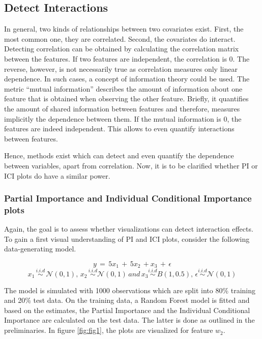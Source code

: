 \documentclass[]{krantz}
\begin{document}
\subsection{Detect Interactions}\label{ch31}

In general, two kinds of relationships between two covariates exist.
First, the most common one, they are correlated. Second, the covariates
do interact. Detecting correlation can be obtained by calculating the
correlation matrix between the features. If two features are
independent, the correlation is 0. The reverse, however, is not
necessarily true as correlation measures only linear dependence. In such
cases, a concept of information theory could be used. The metric
``mutual information'' describes the amount of information about one
feature that is obtained when observing the other feature. Briefly, it
quantifies the amount of shared information between features and
therefore, measures implicitly the dependence between them. If the
mutual information is 0, the features are indeed independent. This
allows to even quantify interactions between features.

Hence, methods exist which can detect and even quantify the dependence
between variables, apart from correlation. Now, it is to be clarified
whether PI or ICI plots do have a similar power.

\subsubsection{Partial Importance and Individual Conditional Importance
plots}\label{ch311}

Again, the goal is to assess whether visualizations can detect
interaction effects. To gain a first visual understanding of PI and ICI
plots, consider the following data-generating model.

\[ y \, = \, 5x_{1} \,  + \, 5x_{2} \, + x_{3}  \, + \, \epsilon\]
\[ x_{1} \, \overset{i.i.d}{\sim} \, \mathcal{N}(0,1), \, x_{2} \, \overset{i.i.d}{\sim}  \mathcal{N}(0, 1) \, and \, x_{3} \overset{i.i.d}{\sim} B(1, 0.5),\,  \epsilon \overset{i.i.d}{\sim} \mathcal{N}(0, 1)\]

The model is simulated with 1000 observations which are split into 80\%
training and 20\% test data. On the training data, a Random Forest model
is fitted and based on the estimates, the Partial Importance and the
Individual Conditional Importance are calculated on the test data. The
latter is done as outlined in the preliminaries. In figure
\ref{fig:fig1}, the plots are visualized for feature \(w_{2}\).
\end{document}
